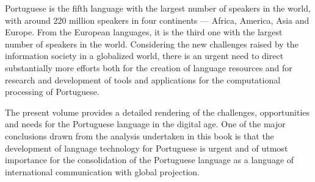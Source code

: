 \begin{multicols}{2}
Portuguese is the fifth language with the largest number of speakers in the world, with
around 220 million speakers in four continents --- Africa, Ame\-ri\-ca, Asia and Europe.
From the European languages, it is the third one with the largest number of speakers
in the world. Considering the new challen\-ges raised by the information society in a globalized world,
there is an urgent need to direct substantially more efforts both for the creation of language resources 
and for research and development of tools and applications for the computational
processing of Portuguese.

The present volume provides a detailed rendering of the challenges, opportunities and needs for the Portuguese language in the digital age.
One of the major conclusions drawn from the analysis undertaken in this book is that
the development of language techno\-lo\-gy for Portuguese is urgent and of utmost importance
for the consolidation of the Portuguese language as a language of international communication with global projection.

\end{multicols}

\clearpage


